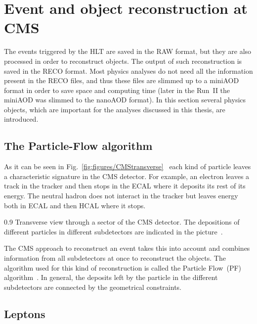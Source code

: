 \newpage

\section{Event and object reconstruction at CMS~\label{sec:objects}}

The events triggered by the HLT are saved in the RAW format, but they are also processed in order to reconstruct objects. The output of such reconstruction is saved in the RECO format. Most physics analyses do not need all the information present in the RECO files, and thus these files are slimmed up to a miniAOD~\cite{Petrucciani:2029414} format in order to save space and computing time (later in the Run~II the miniAOD was slimmed to the nanoAOD format). In this section several physics objects, which are important for the analyses discussed in this thesis, are introduced.


\subsection{The Particle-Flow algorithm}

As it can be seen in Fig.~\ref{fig:figures/CMStransverse}~\cite{Sirunyan:2017ulk} each kind of particle leaves a characteristic signature in the CMS detector. For example, an electron leaves a track in the tracker and then stops in the ECAL where it deposits its rest of its energy. The neutral hadron does not interact in the tracker but leaves energy both in ECAL and then HCAL where it stops.

                 {0.9}       %
                 { Transverse view through a sector of the CMS detector. The depositions of different particles in different subdetectors are indicated in the picture~\cite{Sirunyan:2017ulk}. }

The CMS approach to reconstruct an event takes this into account and combines information from all subdetectors at once to reconstruct the objects. The algorithm used for this kind of reconstruction is called the Particle Flow~(PF) algorithm~\cite{Sirunyan:2017ulk}. In general, the deposits left by the particle in the different subdetectors are connected by the geometrical constraints.


\subsection{Leptons}

